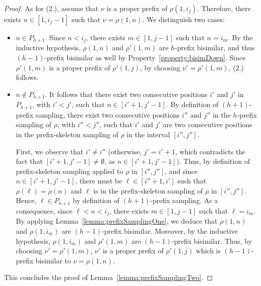 \begin{proof}
As for (2.), assume that $\nu$ is a proper prefix of $\rho(1,i_j)$. Therefore, there exists $n\in [1,i_j-1]$ such that $\nu= \rho(1,n)$. We distinguish two cases:
%
\begin{itemize}
  \item $n\in P_{h+1}$. Since $n<i_j$, there exists $m\in [1,j-1]$ such that $n=i_m$. By the inductive hypothesis, $\rho(1,n)$ and $\rho'(1,m)$ are $h$-prefix bisimilar, and thus $(h-1)$-prefix bisimilar as well by Property~\ref{property:bisimDown}.
  Since $\rho'(1,m)$ is a proper prefix of $\rho'(1,j)$, by choosing $\nu'=\rho'(1,m)$, (2.) follows.
  \item $n\notin P_{h+1}$. It follows that there exist two consecutive positions $i'$ and $j'$ in $P_{h+1}$, with $i'<j'$, such that $n\in [i'+1,j'-1]$. By definition of $(h+1)$-prefix sampling, there exist two consecutive positions $i''$ and $j''$ in the $h$-prefix sampling of $\rho$, with $i''<j''$, such that $i'$ and $j'$ are two consecutive positions in the prefix-skeleton sampling of $\rho$ in the interval $[i'',j'']$.

  First, we observe that $i'\neq i''$ (otherwise, $j'=i'+1$, which contradicts the fact that $[i'+1,j'-1]\neq \emptyset$, as $n\in [i'+1,j'-1]$). Thus, by definition of prefix-skeleton sampling applied to $\rho$ in $[i'',j'']$, and since $n\in [i'+1,j'-1]$, there must be $\ell\in [i''+1,i']$ such that $\rho(\ell)=\rho(n)$ and $\ell$ is in the prefix-skeleton sampling of $\rho$ in $[i'',j'']$. Hence, $\ell\in P_{h+1}$ by definition of $(h+1)$-prefix sampling. As a consequence, since $\ell<n<i_j$, there exists $m\in [1,j-1]$ such that $\ell=i_m$. By applying Lemma~\ref{lemma:prefixSamplingOne}, we deduce that $\rho(1,n)$ and $\rho(1,i_m)$ are $(h-1)$-prefix bisimilar. Moreover, by the inductive hypothesis, $\rho(1,i_m)$ and $\rho'(1,m)$ are $(h-1)$-prefix bisimilar. Thus, by choosing $\nu'=\rho'(1,m)$, $\nu'$ is a proper prefix of $\rho'(1,j)$ which is $(h-1)$-prefix bisimilar to $\nu=\rho(1,n)$.
\end{itemize}
%
This concludes the proof of Lemma~\ref{lemma:prefixSamplingTwo}.
\end{proof}

